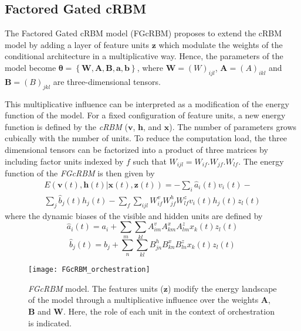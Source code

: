 \documentclass[letterpaper]{article}
\begin{document}
\subsection{Factored Gated cRBM}
The Factored Gated cRBM model (FGcRBM) \cite{taylor2009factored} proposes to extend the cRBM model by adding a layer of feature units $\bm{z}$ which modulate the weights of the conditional architecture in a multiplicative way. Hence, the parameters of the model become $\bm{\theta} = \left\lbrace \bm{W} , \bm{A} , \bm{B} , \bm{a} , \bm{b} \right\rbrace$, where $\bm{W} = (W)_{ijl}$, $\bm{A}=(A)_{ikl}$ and $\bm{B}=(B)_{jkl}$ are three-dimensional tensors.

This multiplicative influence can be interpreted as a modification of the energy function of the model. For a fixed configuration of feature units, a new energy function is defined by the \textit{cRBM} ($\bm{v}$, $\bm{h}$, and $\bm{x}$). The number of parameters grows cubically with the number of units. To reduce the computation load, the three dimensional tensors can be factorized into a product of three matrices by including factor units indexed by $f$ such that $W_{ijl} = W_{if} . W_{jf} . W_{lf}$.
The energy function of the \textit{FGcRBM} is then given by
\begin{equation}
\begin{split}
E(\bm{v}(t),\bm{h}(t)|\bm{x}(t),\bm{z}(t)) = - \sum_{i} \hat{a}_{i}(t)v_{i}(t) - \\ \sum_{j} \hat{b}_{j}(t)h_{j}(t)
-\sum_{f}\sum_{ijl} W_{if}^{v} W_{jf}^{h} W_{lf}^{z} v_{i}(t) h_{j}(t) z_{l}(t) 
\end{split}
\end{equation}
where the dynamic biases of the visible and hidden units are defined by
\begin{equation}
\hat{a}_{i}(t) = a_{i} + \sum_{m} \sum_{kl}A_{im}^{v}A_{km}^{x}A_{lm}^{z}x_{k}(t)z_{l}(t)
\end{equation}
\begin{equation}
\hat{b}_{j}(t) = b_{j} + \sum_{n} \sum_{kl}B_{jn}^{h}B_{kn}^{x}B_{ln}^{z}x_{k}(t)z_{l}(t)
\end{equation}

\begin{figure}
\centering
\texttt{[image: FGcRBM\_orchestration]}
\caption{\textit{FGcRBM} model. The features units ($\bm{z}$) modify the energy landscape of the model through a multiplicative influence over the weights $\bm{A}$, $\bm{B}$ and $\bm{W}$. Here, the role of each unit in the context of orchestration is indicated.}
\label{fig:FGcRBM}
\end{figure}
\end{document}
